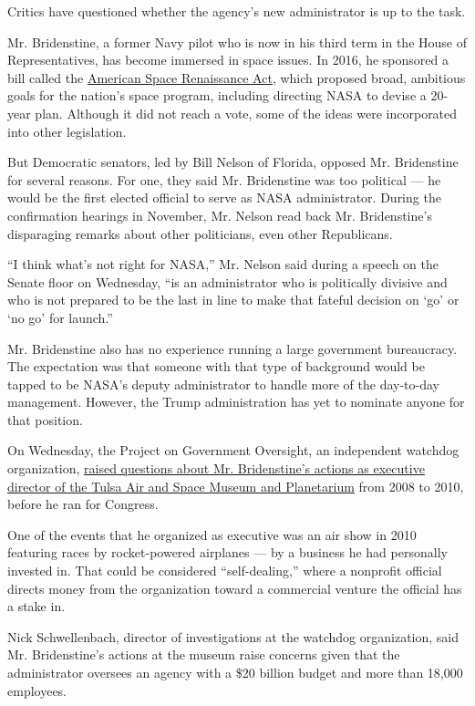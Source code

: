 Critics have questioned whether the agency's new administrator is up to
the task.

Mr. Bridenstine, a former Navy pilot who is now in his third term in the
House of Representatives, has become immersed in space issues. In 2016,
he sponsored a bill called the
\href{http://spacerenaissanceact.com/}{American Space Renaissance Act},
which proposed broad, ambitious goals for the nation's space program,
including directing NASA to devise a 20-year plan. Although it did not
reach a vote, some of the ideas were incorporated into other
legislation.

But Democratic senators, led by Bill Nelson of Florida, opposed Mr.
Bridenstine for several reasons. For one, they said Mr. Bridenstine was
too political --- he would be the first elected official to serve as
NASA administrator. During the confirmation hearings in November, Mr.
Nelson read back Mr. Bridenstine's disparaging remarks about other
politicians, even other Republicans.

``I think what's not right for NASA,'' Mr. Nelson said during a speech
on the Senate floor on Wednesday, ``is an administrator who is
politically divisive and who is not prepared to be the last in line to
make that fateful decision on `go' or `no go' for launch.''

Mr. Bridenstine also has no experience running a large government
bureaucracy. The expectation was that someone with that type of
background would be tapped to be NASA's deputy administrator to handle
more of the day-to-day management. However, the Trump administration has
yet to nominate anyone for that position.

On Wednesday, the Project on Government Oversight, an independent
watchdog organization,
\href{https://www.thedailybeast.com/how-trumps-nasa-nominee-used-a-nonprofit-he-ran-to-benefit-himself}{raised
questions about Mr. Bridenstine's actions as executive director of the
Tulsa Air and Space Museum and Planetarium} from 2008 to 2010, before he
ran for Congress.

One of the events that he organized as executive was an air show in 2010
featuring races by rocket-powered airplanes --- by a business he had
personally invested in. That could be considered ``self-dealing,'' where
a nonprofit official directs money from the organization toward a
commercial venture the official has a stake in.

Nick Schwellenbach, director of investigations at the watchdog
organization, said Mr. Bridenstine's actions at the museum raise
concerns given that the administrator oversees an agency with a \$20
billion budget and more than 18,000 employees.

